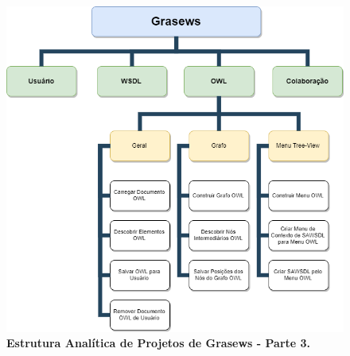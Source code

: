     \begin{figure}[h]
            \includegraphics[scale=0.45]{9-pos-textuais/apendices/imagens/grasews-eap-owl.png}
        \centering
        \caption[Estrutura Analítica de Projetos de Grasews - Parte 3]{\textbf{Estrutura Analítica de Projetos de Grasews - Parte 3.}}
        \label{fig:grasews-eap-owl}
    \end{figure}

